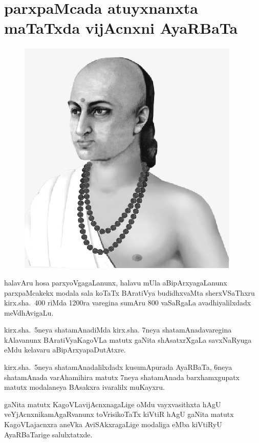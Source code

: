 \chapter{parxpaMcada atuyxnanxta maTaTxda vijAcnxni AyaRBaTa}%

\begin{figure}
  \centering\includegraphics[scale=0.8]{src/figures/aryabhata.eps}
    \end{figure}


halavAru hosa parxyoVgagaLanunx, halavu mUla aBipArxyagaLanunx parxpaMcakekx modala sala koTaTx BAratiVya budidhxvaMta sherxVSaThxru kirx.sha.~{\rm 400} riMda {\rm 1200}ra varegina sumAru {\rm 800} vaSaRgaLa avadhiyalilxdadx meVdhAvigaLu.

kirx.sha.~{\rm 5}neya shatamAnadiMda kirx.sha. {\rm 7}neya shatamAnadavaregina kAlavanunx BAratiVya\break KagoVLa matutx gaNita shAsatxrXgaLa savxNaRyuga eMdu kelavaru aBipArxyapaDutAtxre.

kirx.sha.~{\rm 5}neya shatamAnadalilxdadx kusumApurada AyaRBaTa, {\rm 6}neya shatamAnada varAhamihira matutx {\rm 7}neya shatamAnada barxhamxgupatx matutx modalaneya BAsakxra ivaralilx muKayxru.

gaNita matutx KagoVLavijAcnxnagaLige oMdu vayxvasithxta hAgU veYjAcnxnikamAgaRvanunx toVrisikoTaTx kiVtiR hAgU gaNita matutx KagoVLajacnxra aneVka AviSAkxragaLige modaliga eMba kiVtiRyU AyaRBaTarige salulxtatxde.


